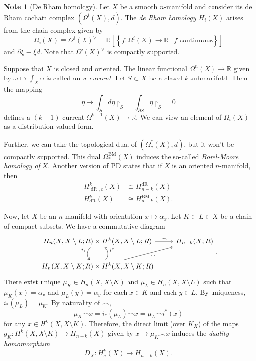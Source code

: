 \documentclass[10pt,letterpaper,cm]{nupset}
\theoremstyle{definition}
\newtheorem{note}[definition]{Note}
\theoremstyle{theorem}
\theoremstyle{remark}
\newcommand{\R}{\mathbb{R}}
\newcommand{\1}{\mathbb{1}}
\newcommand{\0}{\vec 0}
\DeclareMathOperator{\dr}{dR}
\DeclareMathOperator{\BM}{BM}
\begin{document}
\begin{note}[De Rham homology]
Let $X$ be a smooth $n$-manifold and consider its de Rham cochain complex $\left(\Omega^i(X), d\right)$. The \textit{de Rham homology $H_i(X)$} arises from the chain complex given by $$\Omega_i(X) \equiv \Omega^i(X)^{\vee} = \R\left[\left\{f : \Omega^i(X) \to \R \mid f \text{ continuous}\right\}\right]$$ and $\partial{\xi} \equiv \xi{d}$. Note that $ \Omega^i(X)^{\vee}$ is compactly supported. 

Suppose that $X$ is closed and oriented. The linear functional $\Omega^n(X) \to \R$ given by $\omega  \mapsto \int_X \omega$ is called an \textit{$n$-current}. Let $S \subset X$ be a closed $k$-submanifold. Then the mapping $$ \eta \mapsto \int_S d{\eta \restriction_S} = \int_{\partial{S}} \eta \restriction_S =0$$ defines a $\left(k-1\right)$-current $\Omega^{k-1}(X) \to \R$. We can view an element of $\Omega_i(X)$ as a distribution-valued form.

Further, we can take the topological dual of $\left(\Omega_c^{\ast}(X), d\right)$, but it won't be compactly supported. This dual $\Omega_{\ast}^{\BM}(X)$ induces the so-called \textit{Borel-Moore homology of $X$}. Another version of PD states that if $X$ is an oriented $n$-manifold, then
\begin{align*}
H^k_{\dr, c}(X) & \cong H^{\dr}_{n-k}(X)
\\  H^k_{\dr}(X) & \cong  H^{\BM}_{n-k}(X) 
. \end{align*}
\end{note}

\medskip

Now, let $X$ be an $n$-manifold with orientation $x \mapsto \alpha_x$. Let $K \subset  L \subset X$ be a chain of compact subsets.  We have a commutative diagram
\[
\begin{tikzcd}
{H_n(X, X \setminus L; R)\times H^k(X, X \setminus L; R)} \arrow[r, "\frown"] \arrow[d, "i_{\ast}"', bend right=49]     & H_{n-k}(X; R) \\
{H_n(X, X \setminus K; R) \times H^k(X, X \setminus K ; R)} \arrow[ru, "\frown"'] \arrow[u, "i^{\ast}"', bend right=49] &              
\end{tikzcd}
.\] There exist unique $\mu_K \in H_n(X, X \setminus K)$ and $\mu_L \in H_n(X, X \setminus L)$ such that $\mu_K(x) = \alpha_x$ and $\mu_L(y) = \alpha_y$ for each $x\in K$ and each $y\in L$. By uniqueness, $i_{\ast}(\mu_L) = \mu_K$. By naturality of $\frown$, $$\mu_K \frown x = i_{\ast}(\mu_L) \frown x = \mu_L \frown i^{\ast}(x)$$ for any $x\in H^k(X, X \setminus K)$. Therefore, the direct limit (over $K_X$) of the maps $g_K : H^k(X, X \setminus K) \to H_{n-k}(X)$ given by $x \mapsto \mu_K \frown x$ induces the \textit{duality homomorphism} $$ D_X : H_c^k(X) \to H_{n-k}(X)  .$$
\end{document}
